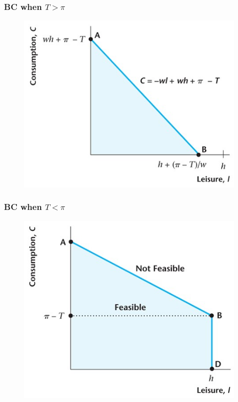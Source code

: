 \documentclass{beamer}
\begin{document}
\begin{frame}
\frametitle[alignment=center]{BC when $T>\pi$}
\begin{figure}
\centering
\includegraphics[scale=0.5]{Figures/W_Fig_4pt3.png}
\end{figure}
\end{frame}

\begin{frame}
\frametitle[alignment=center]{BC when $T<\pi$}
\begin{figure}
\centering
\includegraphics[scale=0.5]{Figures/W_Fig_4pt4.png}
\end{figure}
\end{frame}
\end{document}
